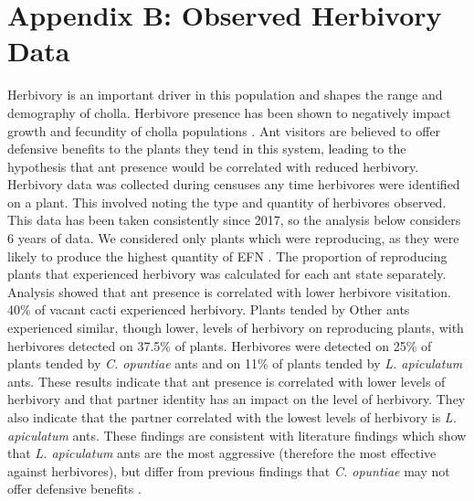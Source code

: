 \documentclass[11pt]{article}
\begin{document}
\section*{Appendix B: Observed Herbivory Data} \label{appendix:B}
Herbivory is an important driver in this population and shapes the range and demography of cholla.
Herbivore presence has been shown to negatively impact growth and fecundity of cholla populations \citep{Miller2009}.
Ant visitors are believed to offer defensive benefits to the plants they tend in this system, leading to the hypothesis that ant presence would be correlated with reduced herbivory.
Herbivory data was collected during censuses any time herbivores were identified on a plant. 
This involved noting the type and quantity of herbivores observed. 
This data has been taken consistently since 2017, so the analysis below considers 6 years of data.
We considered only plants which were reproducing, as they were likely to produce the highest quantity of EFN \citep{Miller2014}.
The proportion of reproducing plants that experienced herbivory was calculated for each ant state separately.
Analysis showed that ant presence is correlated with lower herbivore visitation.
40\% of vacant cacti experienced herbivory.
Plants tended by Other ants experienced similar, though lower, levels of herbivory on reproducing plants, with herbivores detected on 37.5\% of plants.
Herbivores were detected on 25\% of plants tended by \textit{C. opuntiae} ants and on 11\% of plants tended by \textit{L. apiculatum} ants.
These results indicate that ant presence is correlated with lower levels of herbivory and that partner identity has an impact on the level of herbivory.
They also indicate that the partner correlated with the lowest levels of herbivory is \textit{L. apiculatum} ants.
These findings are consistent with literature findings which show that \textit{L. apiculatum} ants are the most aggressive (therefore the most effective against herbivores), but differ from previous findings that \textit{C. opuntiae} may not offer defensive benefits \citep{Miller2007}.
\end{document}
